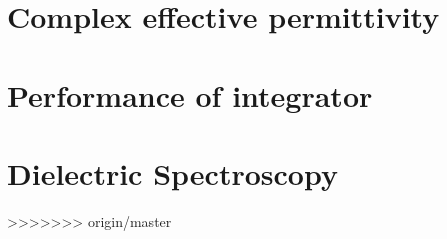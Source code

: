 \section{Complex effective permittivity}
\subsection{}

\section{Performance of integrator}

\section{Dielectric Spectroscopy}

\begin{figure}[htbp]
\end{figure}
>>>>>>> origin/master
